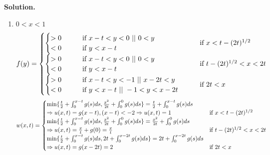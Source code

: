 \documentclass[a4paper]{book}
\newenvironment{solution}%
{\noindent\textbf{Solution.}}%
{\qedhere}
\numberwithin{equation}{chapter}
\theoremstyle{definition}
\begin{document}
\begin{solution}
\begin{enumerate}
  \item $0 < x < 1$
    \[f(y) =
      \begin{aligned}
        \begin{cases}
          \begin{cases}
            > 0 \qquad &\textmd{if } x - t < y < 0\ ||\ 0 < y \\
            < 0  \qquad &\textmd{if } y < x - t \\
          \end{cases}  \qquad &\textmd{if } x < t - (2t)^{1/2} \\
          \begin{cases}
            > 0 \qquad &\textmd{if } x - t < y < 0 \ ||\ 0 < y \\
            < 0  \qquad &\textmd{if } y < x - t \\
          \end{cases}  \qquad &\textmd{if } t - (2t)^{1/2} < x < 2t \\
          \begin{cases}
            > 0 \qquad &\textmd{if } x - t < y < -1\ ||\ x - 2t < y \\
            < 0  \qquad &\textmd{if } y < x - t\ ||\ -1 < y < x - 2t \\
          \end{cases}  \qquad &\textmd{if } 2t < x \\
        \end{cases}
      \end{aligned}
    \]
    \[w(x,t) =
      \begin{cases}
        \min\{\frac{t}{2} + \int_0^{x-t} g(s)ds, \frac{x^2}{2t} + \int_0^{0} g(s)ds\} = \frac{t}{2} + \int_0^{x-t} g(s)ds \\ \Rightarrow u(x,t)  = g(x-t),(x - t) < -2  \Rightarrow u(x,t) = 1 \qquad &\textmd{if } x < t - (2t)^{1/2} \\
        \min\{\frac{t}{2} + \int_0^{x-t} g(s)ds, \frac{x^2}{2t} + \int_0^{0} g(s)ds\} = \frac{x^2}{2t} + \int_0^{0} g(s)ds \\ \Rightarrow u(x,t) = \frac{x}{t} + g(0) = \frac{x}{t}  \qquad &\textmd{if } t - (2t)^{1/2} < x < 2t \\
        \min\{\frac{t}{2} + \int_0^{x-t} g(s)ds, 2t + \int_0^{x-2t} g(s)ds\} = 2t + \int_0^{x-2t} g(s)ds \\ \Rightarrow u(x,t) = g(x-2t) = 2  \qquad &\textmd{if } 2t < x \\
      \end{cases}
    \]


\end{enumerate}
\end{solution}
\end{document}
